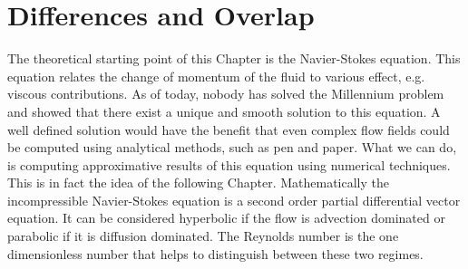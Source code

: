 \section{Differences and Overlap}
\label{sec:shallow_to_thin}

The theoretical starting point of this Chapter is the Navier-Stokes equation.
This equation relates the change of momentum of the fluid to various effect, e.g. viscous contributions. 
As of today, nobody has solved the Millennium problem and showed that there exist a unique and smooth solution to this equation.
A well defined solution would have the benefit that even complex flow fields could be computed using analytical methods, such as pen and paper.
What we can do, is computing approximative results of this equation using numerical techniques.
This is in fact the idea of the following Chapter.
Mathematically the incompressible Navier-Stokes equation is a second order partial differential vector equation. 
It can be considered hyperbolic if the flow is advection dominated or parabolic if it is diffusion dominated.
The Reynolds number is the one dimensionless number that helps to distinguish between these two regimes. 

